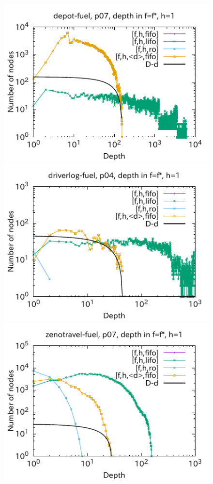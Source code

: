 
\begin{figure}[htbp]
\includegraphics{img/output-lmcut/depot-fuel/p07-1.pdf}
\includegraphics{img/output-lmcut/driverlog-fuel/p04-1.pdf}
\includegraphics{img/output-lmcut/zenotravel-fuel/p07-1.pdf}

\end{figure}
